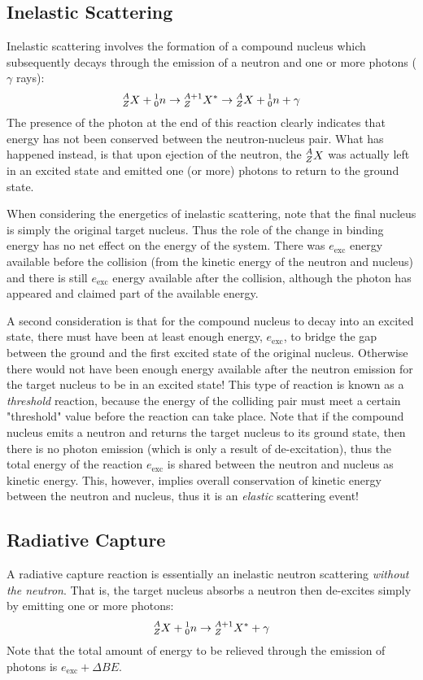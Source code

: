 \documentclass[11pt]{article}
\newcommand\leftidx[3]{{\vphantom{#2}}#1#2#3}
\begin{document}
\subsection{Inelastic Scattering}
\label{sec:orgheadline6}
Inelastic scattering involves the formation of a compound nucleus which subsequently decays through the emission of a neutron and one or more photons (\(\gamma\) rays):
\begin{align}
  \leftidx{^A_Z}{X}{} + \leftidx{^1_0}{n}{} 
  \rightarrow \leftidx{^{A+1}_Z}{X}{^*}
  \rightarrow \leftidx{^A_Z}{X}{} + \leftidx{^1_0}{n}{} + \gamma
\end{align}
The presence of the photon at the end of this reaction clearly indicates that energy has not been conserved between the neutron-nucleus pair.  What has happened instead, is that upon ejection of the neutron, the \(\leftidx{^A_Z}{X}{}\) was actually left in an excited state and emitted one (or more) photons to return to the ground state.

When considering the energetics of inelastic scattering, note that the final nucleus is simply the original target nucleus.  Thus the role of the change in binding energy has no net effect on the energy of the system.  There was \(e_\text{exc}\) energy available before the collision (from the kinetic energy of the neutron and nucleus) and there is still \(e_\text{exc}\) energy available after the collision, although the photon has appeared and claimed part of the available energy.

A second consideration is that for the compound nucleus to decay into an excited state, there must have been at least enough energy, \(e_\text{exc}\), to bridge the gap between the ground and the first excited state of the original nucleus.  Otherwise there would not have been enough energy available after the neutron emission for the target nucleus to be in an excited state!  This type of reaction is known as a \emph{threshold} reaction, because the energy of the colliding pair must meet a certain "threshold" value before the reaction can take place.  Note that if the compound nucleus emits a neutron and returns the target nucleus to its ground state, then there is no photon emission (which is only a result of de-excitation), thus the total energy of the reaction \(e_\text{exc}\) is shared between the neutron and nucleus as kinetic energy.  This, however, implies overall conservation of kinetic energy between the neutron and nucleus, thus it is an \emph{elastic} scattering event!

\subsection{Radiative Capture}
\label{sec:orgheadline7}
A radiative capture reaction is essentially an inelastic neutron scattering \emph{without the neutron}.  That is, the target nucleus absorbs a neutron then de-excites simply by emitting one or more photons:
\begin{align}
  \leftidx{^A_Z}{X}{} + \leftidx{^1_0}{n}{} 
  \rightarrow \leftidx{^{A+1}_Z}{X}{^*} + \gamma
\end{align}
Note that the total amount of energy to be relieved through the emission of photons is \(e_{\text{exc}} + \Delta BE\).
\end{document}
